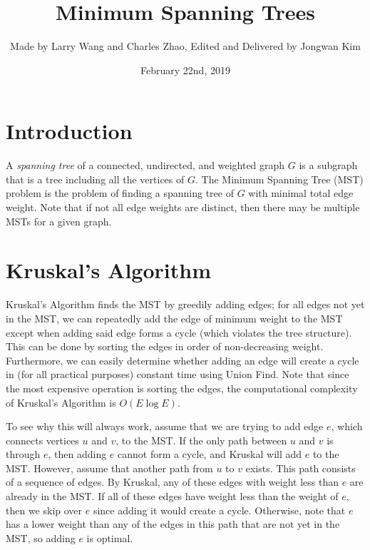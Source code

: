 \documentclass[11pt]{article}
\title{Minimum Spanning Trees}
\author{Made by Larry Wang and Charles Zhao, Edited and Delivered by Jongwan Kim}
\date{February 22nd, 2019}
\begin{document}
\maketitle

\section{Introduction}
A \textit{spanning tree} of a connected, undirected, and weighted graph $G$ is a subgraph that is a tree including all the vertices of $G$. The Minimum Spanning Tree (MST) problem is the problem of finding a spanning tree of $G$ with minimal total edge weight. Note that if not all edge weights are distinct, then there may be multiple MSTs for a given graph.

\begin{center}
\end{center}

\section{Kruskal's Algorithm}

Kruskal's Algorithm finds the MST by greedily adding edges; for all edges not yet in the MST, we can repeatedly add the edge of minimum weight to the MST except when adding said edge forms a cycle (which violates the tree structure). This can be done by sorting the edges in order of non-decreasing weight. Furthermore, we can easily determine whether adding an edge will create a cycle in (for all practical purposes) constant time using Union Find. Note that since the most expensive operation is sorting the edges, the computational complexity of Kruskal's Algorithm is $O(E \log E)$. 

To see why this will always work, assume that we are trying to add edge $e$, which connects vertices $u$ and $v$, to the MST. If the only path between $u$ and $v$ is through $e$, then adding $e$ cannot form a cycle, and Kruskal will add $e$ to the MST. However, assume that another path from $u$ to $v$ exists. This path consists of a sequence of edges. By Kruskal, any of these edges with weight less than $e$ are already in the MST. If all of these edges have weight less than the weight of $e$, then we skip over $e$ since adding it would create a cycle. Otherwise, note that $e$ has a lower weight than any of the edges in this path that are not yet in the MST, so adding $e$ is optimal.
\end{document}
